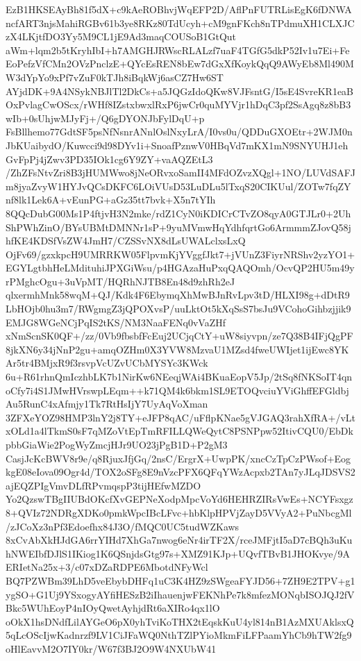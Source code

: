 \documentclass[multi=frame]{standalone}
\begin{document}
\begin{world}
        EzB1HKSEAyBh81f5dX+c9kAeROBhvjWqEFP2D/AflPnFUTRLisEgK6fDNWAncfART3njsMahiRGBv61b3ye8RKz80TdUcyh+cM9gnFKch8nTPdmuXH1CLXJCzX4LKjtfDO3Yy5M9CL1jE9Ad3maqCOUSoB1GtQut
        aWm+lqm2b5tKryhIbI+h7AMGHJRWscRLALzf7uaF4TGfG5dkP52Iv1u7Ei+FeEoPefzVfCMn2OVzPnclzE+QYcEsREN8bEw7dGxXfKoykQqQ9AWyEb8Ml490MW3dYpYo9xPf7vZuF0kTJh8iBqkWj6asCZ7Hw6ST
        AYjdDK+9A4NSykNBJlTl2DkCs+a5JQGzIdoQKw8VJFsntG/I5sE4SvreKR1eaBOxPvlagCwOScx/rWHf8IZstxbwxlRxP6jwCr0quMYVjr1hDqC3pf2SsAgq8z8bB3wIb+0sUhjwMJyFj+/Q6gDYONJbFylDqU+p
        FsBllhemo77GdtSF5psNfNsnrANnlOslNxyLrA/I0vs0u/QDDuGXOEtr+2WJM0nJbKUaibydO/Kuwcci9d98DYv1i+SnoafPznwV0HBqVd7mKX1mN9SNYUHJ1ehGvFpPj4jZwv3PD35IOk1cg6Y9ZY+vaAQZEtL3
        /ZhZFsNtvZri8B3jHUMWwo8jNeORvxoSamII4MFdOZvzXQgl+1NO/LUVdSAFJm8jyaZvyW1HYJvQCsDKFC6LOiVUsD53LuDLu5lTxqS20CIKUul/ZOTw7fqZYnf8lk1Lek6A+vEunPG+aGz35tt7bvk+X5n7tYIh
        8QQcDubG00Ms1P4ftjvH3N2mke/rdZ1CyN0iKDICrCTvZO8qyA0GTJLr0+2UhShPWhZinO/BYsUBMtDMNNr1sP+9yuMVmwHqYdhfqrtGo6ArmmmZJovQ58jhfKE4KDSfVsZW4JmH7/CZSSvNX8dLsUWALclxsLxQ
        OjFv69/gzxkpcH9UMRRKW05FlpvmKjYVggfJkt7+jVUnZ3FiyrNRShv2yzYO1+EGYLgtbhHeLMdituhiJPXGiWsu/p4HGAzaHuPxqQAQOmh/OcvQP2HU5m49yrPMghcOgu+3uVpMT/HQRhNJTB8En48d9zhRh2eJ
        qlxermhMnk58wqM+QJ/Kdk4F6EbymqXhMwBJnRvLpv3tD/HLXI98g+dDtR9LbHOjb0hu3m7/RWgmgZ3jQPOXvsP/uuLktOt5kXqSsS7bsJu9VCohoGihbzjjik9EMJG8WGeNCjPqIS2tKS/NM3NaaFENq0vVaZHf
        xNmScnSK0QF+/zz/0Vb9fbsbfFcEuj2UCjqCtY+uW8siyvpn/ze7Q38B4IFjQgPF8jkXN6y34jNnP2gu+amqOZHm0X3YVW8MzvaU1MZsd4fweUWIjet1ijEwc8YKAr5tr4BMjxR9f3rsvpVcUZvUCbMYSYc3KWck
        6u+R61rhnQmIczhbLK7b1NirKw6NEeqjWAi4BKuaEopV5Jp/2tSq8fNKSoIT4qnoCfy7i4S1JMwHVrswpLEqm++k71QM4k6bkm1SL9ETOQvciuYViGhffEFGldbjAu5RunC4xAfmjy1Tk7RtHsIjY7UyAqVoXman
        3ZFXeYOZ98HMP3lnY2j8TY+eJFP8qAC/uFflpKNae5gVJGAQ3rahXfRA+/vLtxOLd1a4lTkmS0sF7qMZoVtEpTmRFILLQWeQytC8PSNPpw52ItivCQU0/EbDkpbbGiaWie2PogWyZmcjHJr9UO23jPgB1D+P2gM3
        CasjJcKcBWV8r9e/q8RjuxJfjGq/2nsC/ErgrX+UwpPK/xncCzTpCzPWsof+EogkgE08eIova09Ogr4d/TOX2oSFg8E9nVzcPFX6QFqYWzAcpxb2TAn7yJLqJDSVS2ajEQZPIgVmvDLfRPvmqspP3tijHEfwMZDO
        Yo2QzswTBgIIUBdOKcfXvGEPNeXodpMpcVoYd6HEHRZIRsVwEs+NCYFsxgz8+QVIz72NDRgXDKo0pmkWpcIBcLFvc+hbKlpHPVjZayD5VVyA2+PuNbcgMl/zJCoXz3nPf3Edoefhx84J3O/fMQC0UC5tudWZKaws
        8xCvAbXkHJdGA6rrYIHd7XhGa7nwog6eNr4irTF2X/rceJMFjtI5aD7cBQh3uKuhNWEIbfDJlS1IKiog1K6QSnjdsGtg97s+XMZ91KJp+UQvfTBvB1JHOKvye/9AERIetNa25x+3/c07xDZaRDPE6MbotdNFyWcl
        BQ7PZWBm39LhD5veEbybDHFq1uC3K4HZ9zSWgeaFYJD56+7ZH9E2TPV+g1ygSO+G1Uj9YSxogyAYfiHESzB2iIhauenjwFEKNhPe7k8mfezMONqbISOJQJ2fVBkc5WUhEoyP4nIOyQwetAyhjdRt6aXIRo4qx1lO
        oOkX1hsDNdfLilAYGeO6pX0yhTviKoTHX2tEqskKuU4yl814nB1AzMXUAklsxQ5qLcOScIjwKadnrzf9LV1CiJFaWQ0NthTZlPYioMkmFiLFPaamYhCb9hTW2fg9oHlEavvM2O7IY0kr/W67f3BJ2O9W4NXUbW41

\end{world}
\end{document}
